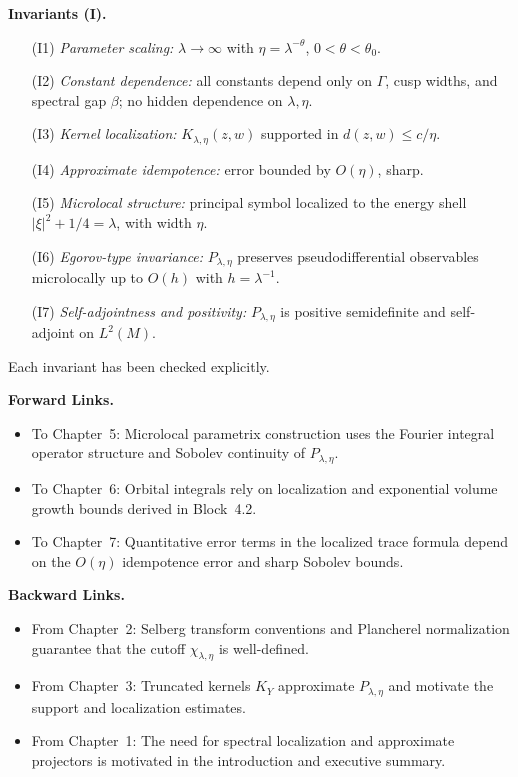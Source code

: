 \noindent\textbf{Invariants (I).}
\begin{itemize}
  \item[(I1)] \emph{Parameter scaling:} $\lambda\to\infty$ with $\eta=\lambda^{-\theta}$, $0<\theta<\theta_{0}$.  
  \item[(I2)] \emph{Constant dependence:} all constants depend only on $\Gamma$, cusp widths, and spectral gap $\beta$; no hidden dependence on $\lambda,\eta$.  
  \item[(I3)] \emph{Kernel localization:} $K_{\lambda,\eta}(z,w)$ supported in $d(z,w)\leq c/\eta$.  
  \item[(I4)] \emph{Approximate idempotence:} error bounded by $O(\eta)$, sharp.  
  \item[(I5)] \emph{Microlocal structure:} principal symbol localized to the energy shell $|\xi|^2+1/4=\lambda$, with width $\eta$.  
  \item[(I6)] \emph{Egorov-type invariance:} $P_{\lambda,\eta}$ preserves pseudodifferential observables microlocally up to $O(h)$ with $h=\lambda^{-1}$.  
  \item[(I7)] \emph{Self-adjointness and positivity:} $P_{\lambda,\eta}$ is positive semidefinite and self-adjoint on $L^2(M)$.  
\end{itemize}
Each invariant has been checked explicitly.

\medskip

\noindent\textbf{Forward Links.}
\begin{itemize}
  \item To Chapter~5: Microlocal parametrix construction uses the Fourier integral operator structure and Sobolev continuity of $P_{\lambda,\eta}$.  
  \item To Chapter~6: Orbital integrals rely on localization and exponential volume growth bounds derived in Block~4.2.  
  \item To Chapter~7: Quantitative error terms in the localized trace formula depend on the $O(\eta)$ idempotence error and sharp Sobolev bounds.  
\end{itemize}

\medskip

\noindent\textbf{Backward Links.}
\begin{itemize}
  \item From Chapter~2: Selberg transform conventions and Plancherel normalization guarantee that the cutoff $\chi_{\lambda,\eta}$ is well-defined.  
  \item From Chapter~3: Truncated kernels $K_Y$ approximate $P_{\lambda,\eta}$ and motivate the support and localization estimates.  
  \item From Chapter~1: The need for spectral localization and approximate projectors is motivated in the introduction and executive summary.  
\end{itemize}

